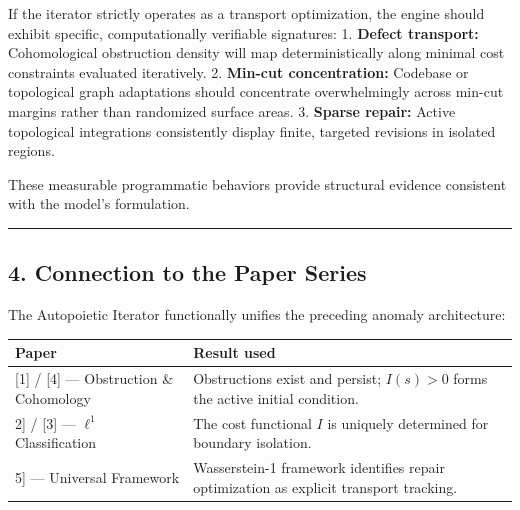 \documentclass[
]{article}
\begin{document}
If the iterator strictly operates as a transport optimization, the
engine should exhibit specific, computationally verifiable signatures:
1. \textbf{Defect transport:} Cohomological obstruction density will map
deterministically along minimal cost constraints evaluated iteratively.
2. \textbf{Min-cut concentration:} Codebase or topological graph
adaptations should concentrate overwhelmingly across min-cut margins
rather than randomized surface areas. 3. \textbf{Sparse repair:} Active
topological integrations consistently display finite, targeted revisions
in isolated regions.

These measurable programmatic behaviors provide structural evidence
consistent with the model's formulation.

\begin{center}\rule{0.5\linewidth}{0.5pt}\end{center}

\subsection{4. Connection to the Paper
Series}\label{connection-to-the-paper-series}

The Autopoietic Iterator functionally unifies the preceding anomaly
architecture:

\begin{longtable}[]{@{}
  >{\raggedright\arraybackslash}p{}
  >{\raggedright\arraybackslash}p{}@{}}
\toprule\noalign{}
\begin{minipage}[b]{\linewidth}\raggedright
Paper
\end{minipage} & \begin{minipage}[b]{\linewidth}\raggedright
Result used
\end{minipage} \\
\midrule\noalign{}
\endhead
\bottomrule\noalign{}
\endlastfoot
{[}1{]} / {[}4{]} --- Obstruction \& Cohomology & Obstructions exist and
persist; \(I(s) > 0\) forms the active initial condition. \\
{[}2{]} / {[}3{]} --- \(\ell^1\) Classification & The cost functional
\(I\) is uniquely determined for boundary isolation. \\
{[}5{]} --- Universal Framework & Wasserstein-1 framework identifies
repair optimization as explicit transport tracking. \\
\end{longtable}
\end{document}
